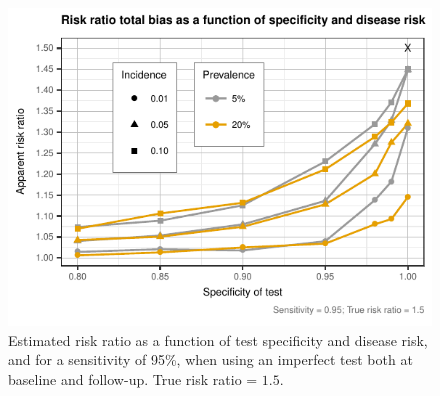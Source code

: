 \documentclass[utf8]{frontiers_suppmat} %
\begin{document}
\begin{figure}[htbp]
  \begin{center}
    \includegraphics[scale=.95]{master-RR15_Se_PrInc-1}
  \end{center}
  \caption{Estimated risk ratio as a function of test specificity and disease
    risk, and for a sensitivity of 95\%, when using an imperfect test both at
    baseline and follow-up. True risk ratio = \(1.5\).}
  \label{fig:apparent_RR15}
\end{figure}
\end{document}
